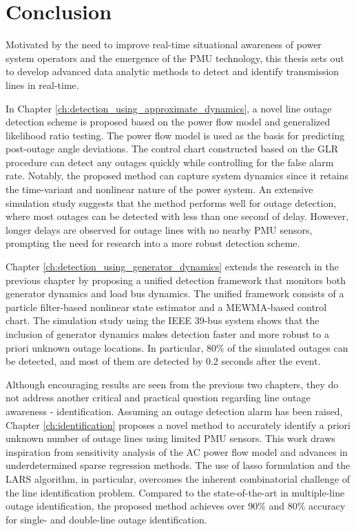 \chapter{Conclusion}
\label{ch:conclusion}

Motivated by the need to improve real-time situational awareness of power system operators and the emergence of the PMU technology, this thesis sets out to develop advanced data analytic methods to detect and identify transmission lines in real-time.

In Chapter \ref{ch:detection_using_approximate_dynamics}, a novel line outage detection scheme is proposed based on the power flow model and generalized likelihood ratio testing. The power flow model is used as the basis for predicting post-outage angle deviations. The control chart constructed based on the GLR procedure can detect any outages quickly while controlling for the false alarm rate. Notably, the proposed method can capture system dynamics since it retains the time-variant and nonlinear nature of the power system. An extensive simulation study suggests that the method performs well for outage detection, where most outages can be detected with less than one second of delay. However, longer delays are observed for outage lines with no nearby PMU sensors, prompting the need for research into a more robust detection scheme.

Chapter \ref{ch:detection_using_generator_dynamics} extends the research in the previous chapter by proposing a unified detection framework that monitors both generator dynamics and load bus dynamics. The unified framework consists of a particle filter-based nonlinear state estimator and a MEWMA-based control chart. The simulation study using the IEEE 39-bus system shows that the inclusion of generator dynamics makes detection faster and more robust to a priori unknown outage locations. In particular, 80\% of the simulated outages can be detected, and most of them are detected by 0.2 seconds after the event. 

Although encouraging results are seen from the previous two chapters, they do not address another critical and practical question regarding line outage awareness - identification. Assuming an outage detection alarm has been raised, Chapter \ref{ch:identification} proposes a novel method to accurately identify a priori unknown number of outage lines using limited PMU sensors. This work draws inspiration from sensitivity analysis of the AC power flow model and advances in underdetermined sparse regression methods. The use of lasso formulation and the LARS algorithm, in particular, overcomes the inherent combinatorial challenge of the line identification problem. Compared to the state-of-the-art in multiple-line outage identification, the proposed method achieves over 90\% and 80\% accuracy for single- and double-line outage identification. 

